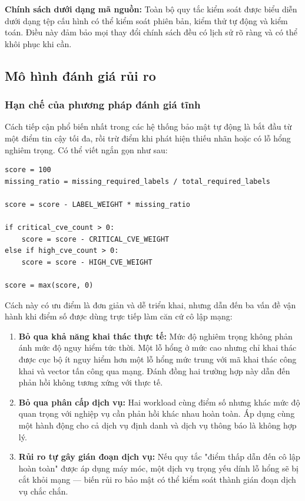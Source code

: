 \textbf{Chính sách dưới dạng mã nguồn:} Toàn bộ quy tắc kiểm soát được biểu diễn dưới dạng tệp cấu hình có thể kiểm soát phiên bản, kiểm thử tự động và kiểm toán. Điều này đảm bảo mọi thay đổi chính sách đều có lịch sử rõ ràng và có thể khôi phục khi cần.

\subsection{Mô hình đánh giá rủi ro}
\label{sec:risk_model}

\subsubsection{Hạn chế của phương pháp đánh giá tĩnh}

Cách tiếp cận phổ biến nhất trong các hệ thống bảo mật tự động là bắt đầu từ một điểm tin cậy tối đa, rồi trừ điểm khi phát hiện thiếu nhãn hoặc có lỗ hổng nghiêm trọng. Có thể viết ngắn gọn như sau:

\begin{listing}[H]
\begin{verbatim}
score = 100
missing_ratio = missing_required_labels / total_required_labels

score = score - LABEL_WEIGHT * missing_ratio

if critical_cve_count > 0:
    score = score - CRITICAL_CVE_WEIGHT
else if high_cve_count > 0:
    score = score - HIGH_CVE_WEIGHT

score = max(score, 0)
\end{verbatim}
\caption{Cách tính điểm tin cậy tuyến tính thường gặp}
\label{lst:linear_trust_score}
\end{listing}

Cách này có ưu điểm là đơn giản và dễ triển khai, nhưng dẫn đến ba vấn đề vận hành khi điểm số được dùng trực tiếp làm căn cứ cô lập mạng:

\begin{enumerate}[itemsep=4pt, parsep=0pt]
    \item \textbf{Bỏ qua khả năng khai thác thực tế:} Mức độ nghiêm trọng không phản ánh mức độ nguy hiểm tức thời. Một lỗ hổng ở mức cao nhưng chỉ khai thác được cục bộ ít nguy hiểm hơn một lỗ hổng mức trung với mã khai thác công khai và vector tấn công qua mạng. Đánh đồng hai trường hợp này dẫn đến phản hồi không tương xứng với thực tế.

    \item \textbf{Bỏ qua phân cấp dịch vụ:} Hai workload cùng điểm số nhưng khác mức độ quan trọng với nghiệp vụ cần phản hồi khác nhau hoàn toàn. Áp dụng cùng một hành động cho cả dịch vụ định danh và dịch vụ thông báo là không hợp lý.

    \item \textbf{Rủi ro tự gây gián đoạn dịch vụ:} Nếu quy tắc "điểm thấp dẫn đến cô lập hoàn toàn" được áp dụng máy móc, một dịch vụ trọng yếu dính lỗ hổng sẽ bị cắt khỏi mạng --- biến rủi ro bảo mật có thể kiểm soát thành gián đoạn dịch vụ chắc chắn.
\end{enumerate}

